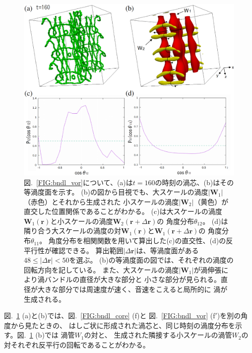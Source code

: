 \documentclass[12pt,a4paper]{jbook}
\begin{document}
			\begin{figure}[H]
				\centering
				\includegraphics[width=15cm]{fig13.eps}
				\caption{
                    図.~\ref{FIG:bndl_vor}について、(a)は$t=160$の時刻の渦芯、(b)はその等渦度面を示す。
                    (b)の図から目視でも、大スケールの渦度$|\bm{W}_1|$（赤色）とそれから生成された
                    小スケールの渦度$|\bm{W}_2|$（黄色）が直交した位置関係であることがわかる。
                    (c)は大スケールの渦度$\bm{W}_1(\bm{r})$と小スケールの渦度$\bm{W}_2(\bm{r}+\Delta\bm{r})$の
                    角度分布$\theta_{12}$。
                    (d)は隣り合う大スケールの渦度の対$\bm{W}_1(\bm{r})$と$\bm{W}_1(\bm{r}+\Delta\bm{r})$の
                    角度分布$\theta_{11}$。
                    角度分布を相関関数を用いて算出した(c)の直交性、(d)の反平行性が確認できる。
                    算出範囲$|\Delta\bm{r}|$は、等渦度面がある$48 \leq |\Delta\bm{r}| < 50$を選ぶ。
                    (b)の等渦度面の図では、それぞれの渦度の回転方向を記している。
                    また、大スケールの渦度$|\bm{W}_1|$が渦伸張により渦バンドルの直径が大きな部分と
                    小さな部分が見られる。直径が大きな部分では周速度が速く、音速をこえると局所的に
                    渦が生成される。
				}
				\label{FIG:orthant}
			\end{figure}
			図.~\ref{FIG:orthant} (a)と(b)では、図.~\ref{FIG:bndl_core} (f)と 図.~\ref{FIG:bndl_vor} (f$'$)を別の角度から見たときの、
			はしご状に形成された渦芯と、同じ時刻の渦度分布を示す。図.~\ref{FIG:orthant} (b)では
			渦管${W}_1$の対と、
			生成された隣接する小スケールの渦管${W}_2$の対それぞれ反平行の回転であることがわかる。
\end{document}
